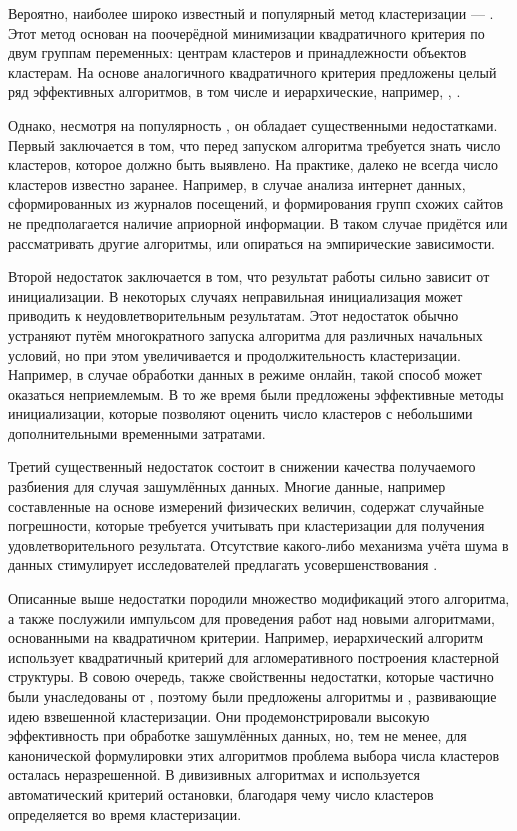\documentclass[12pt]{diploma}
\begin{document}
		Вероятно, наиболее широко известный и популярный метод кластеризации --- \kmeans \cite{k-means-canonical}. Этот метод основан на поочерёдной минимизации квадратичного критерия по двум группам переменных: центрам кластеров и принадлежности объектов кластерам. На основе аналогичного квадратичного критерия предложены целый ряд эффективных алгоритмов, в том числе и иерархические, например, \Ward, \BisectingKmeans. 
		
		Однако, несмотря на популярность \kmeans, он обладает существенными недостатками. Первый заключается в том, что перед запуском алгоритма требуется знать число кластеров, которое должно быть выявлено. На практике, далеко не всегда число кластеров известно заранее. Например, в случае анализа интернет данных, сформированных из журналов посещений, и формирования групп схожих сайтов не предполагается наличие априорной информации. В таком случае придётся или рассматривать другие алгоритмы, или опираться на эмпирические зависимости.
		
		Второй недостаток заключается в том, что результат работы \kmeans сильно зависит от инициализации. В некоторых случаях неправильная инициализация может приводить к неудовлетворительным результатам. Этот недостаток обычно устраняют путём многократного запуска алгоритма для различных начальных условий, но при этом увеличивается и продолжительность кластеризации. Например, в случае обработки данных в режиме онлайн, такой способ может оказаться неприемлемым.  В то же время были предложены эффективные методы инициализации, которые позволяют оценить число кластеров с небольшими дополнительными временными затратами. 
		
		Третий существенный недостаток \kmeans состоит в снижении качества получаемого разбиения для случая зашумлённых данных. Многие данные, например составленные на основе измерений физических величин, содержат случайные погрешности, которые требуется учитывать при кластеризации для получения удовлетворительного результата. Отсутствие какого-либо механизма учёта шума в данных стимулирует исследователей предлагать усовершенствования \kmeans.
		
		Описанные выше недостатки \kmeans породили множество модификаций этого алгоритма, а также послужили импульсом для проведения работ над новыми алгоритмами, основанными на квадратичном критерии. Например, иерархический алгоритм \Ward \cite{ward-canonical} использует квадратичный критерий для агломеративного построения кластерной структуры. В совою очередь, \Ward также свойственны недостатки, которые частично были унаследованы от \kmeans, поэтому были предложены алгоритмы \Wardp и \AWardpb \cite{amorim-makarenkov-mirkin}, развивающие идею взвешенной кластеризации. Они продемонстрировали высокую эффективность при обработке зашумлённых данных, но, тем не менее, для канонической формулировки этих алгоритмов проблема выбора числа кластеров осталась неразрешенной. В дивизивных алгоритмах \BiKMR и \dePDDP \cite{kovaleva} используется автоматический критерий остановки, благодаря чему число кластеров определяется во время кластеризации.
		
\end{document}
